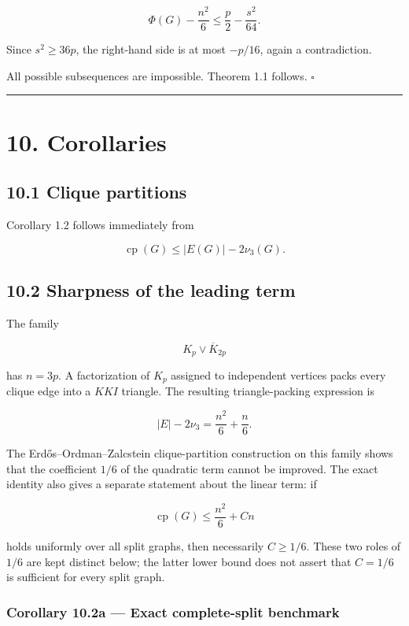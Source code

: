 \documentclass[
  american,
  11pt,
  a4paper,
]{article}
\begin{document}
\[
\Phi(G)-\frac{n^2}{6}
\le
\frac p2-\frac{s^2}{64}.
\tag{9.20}
\]

Since \(s^2\ge36p\), the right-hand side is at most \(-p/16\), again a contradiction.

All possible subsequences are impossible. Theorem 1.1 follows. \(\square\)

\begin{center}\rule{0.5\linewidth}{0.5pt}\end{center}

\section{10. Corollaries}\label{corollaries}

\subsection{10.1 Clique partitions}\label{clique-partitions}

Corollary 1.2 follows immediately from

\[
\operatorname{cp}(G)
\le
|E(G)|-2\nu_3(G).
\]

\subsection{10.2 Sharpness of the leading term}\label{sharpness-of-the-leading-term}

The family

\[
K_p\vee\overline K_{2p}
\]

has \(n=3p\). A factorization of \(K_p\) assigned to independent vertices packs every clique edge into a \(KKI\) triangle. The resulting triangle-packing expression is

\[
|E|-2\nu_3
=
\frac{n^2}{6}+\frac n6.
\tag{10.1}
\]

The Erdős--Ordman--Zalcstein clique-partition construction on this family shows that the coefficient \(1/6\) of the quadratic term cannot be improved. The exact identity also gives a separate statement about the linear term: if

\[
\operatorname{cp}(G)\le \frac{n^2}{6}+Cn
\]

holds uniformly over all split graphs, then necessarily \(C\ge1/6\). These two roles of \(1/6\) are kept distinct below; the latter lower bound does not assert that \(C=1/6\) is sufficient for every split graph.

\subsubsection{Corollary 10.2a --- Exact complete-split benchmark}\label{corollary-10.2a-exact-complete-split-benchmark}
\end{document}
